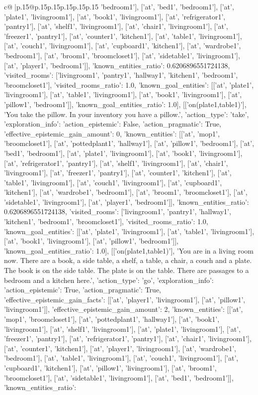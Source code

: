 \documentclass{article}
\begin{document}
{\begin{supertabular}{c@{$\;$}|p{.15\linewidth}@{}p{.15\linewidth}p{.15\linewidth}p{.15\linewidth}p{.15\linewidth}p{.15\linewidth}}
{{{'bedroom1'], ['at', 'bed1', 'bedroom1'], ['at', 'plate1', 'livingroom1'], ['at', 'book1', 'livingroom1'], ['at', 'refrigerator1', 'pantry1'], ['at', 'shelf1', 'livingroom1'], ['at', 'chair1', 'livingroom1'], ['at', 'freezer1', 'pantry1'], ['at', 'counter1', 'kitchen1'], ['at', 'table1', 'livingroom1'], ['at', 'couch1', 'livingroom1'], ['at', 'cupboard1', 'kitchen1'], ['at', 'wardrobe1', 'bedroom1'], ['at', 'broom1', 'broomcloset1'], ['at', 'sidetable1', 'livingroom1'], ['at', 'player1', 'bedroom1']], 'known_entities_ratio': 0.6206896551724138, 'visited_rooms': ['livingroom1', 'pantry1', 'hallway1', 'kitchen1', 'bedroom1', 'broomcloset1'], 'visited_rooms_ratio': 1.0, 'known_goal_entities': [['at', 'plate1', 'livingroom1'], ['at', 'table1', 'livingroom1'], ['at', 'book1', 'livingroom1'], ['at', 'pillow1', 'bedroom1']], 'known_goal_entities_ratio': 1.0}}], [['on(plate1,table1)'], 'You take the pillow. In your inventory you have a pillow.', {'action_type': 'take', 'exploration_info': {'action_epistemic': False, 'action_pragmatic': True, 'effective_epistemic_gain_amount': 0, 'known_entities': [['at', 'mop1', 'broomcloset1'], ['at', 'pottedplant1', 'hallway1'], ['at', 'pillow1', 'bedroom1'], ['at', 'bed1', 'bedroom1'], ['at', 'plate1', 'livingroom1'], ['at', 'book1', 'livingroom1'], ['at', 'refrigerator1', 'pantry1'], ['at', 'shelf1', 'livingroom1'], ['at', 'chair1', 'livingroom1'], ['at', 'freezer1', 'pantry1'], ['at', 'counter1', 'kitchen1'], ['at', 'table1', 'livingroom1'], ['at', 'couch1', 'livingroom1'], ['at', 'cupboard1', 'kitchen1'], ['at', 'wardrobe1', 'bedroom1'], ['at', 'broom1', 'broomcloset1'], ['at', 'sidetable1', 'livingroom1'], ['at', 'player1', 'bedroom1']], 'known_entities_ratio': 0.6206896551724138, 'visited_rooms': ['livingroom1', 'pantry1', 'hallway1', 'kitchen1', 'bedroom1', 'broomcloset1'], 'visited_rooms_ratio': 1.0, 'known_goal_entities': [['at', 'plate1', 'livingroom1'], ['at', 'table1', 'livingroom1'], ['at', 'book1', 'livingroom1'], ['at', 'pillow1', 'bedroom1']], 'known_goal_entities_ratio': 1.0}}], [['on(plate1,table1)'], 'You are in a living room now. There are a book, a side table, a shelf, a table, a chair, a couch and a plate. The book is on the side table. The plate is on the table. There are passages to a bedroom and a kitchen here.', {'action_type': 'go', 'exploration_info': {'action_epistemic': True, 'action_pragmatic': True, 'effective_epistemic_gain_facts': [['at', 'player1', 'livingroom1'], ['at', 'pillow1', 'livingroom1']], 'effective_epistemic_gain_amount': 2, 'known_entities': [['at', 'mop1', 'broomcloset1'], ['at', 'pottedplant1', 'hallway1'], ['at', 'book1', 'livingroom1'], ['at', 'shelf1', 'livingroom1'], ['at', 'plate1', 'livingroom1'], ['at', 'freezer1', 'pantry1'], ['at', 'refrigerator1', 'pantry1'], ['at', 'chair1', 'livingroom1'], ['at', 'counter1', 'kitchen1'], ['at', 'player1', 'livingroom1'], ['at', 'wardrobe1', 'bedroom1'], ['at', 'table1', 'livingroom1'], ['at', 'couch1', 'livingroom1'], ['at', 'cupboard1', 'kitchen1'], ['at', 'pillow1', 'livingroom1'], ['at', 'broom1', 'broomcloset1'], ['at', 'sidetable1', 'livingroom1'], ['at', 'bed1', 'bedroom1']], 'known_entities_ratio': }}}
\end{supertabular}}
\end{document}
